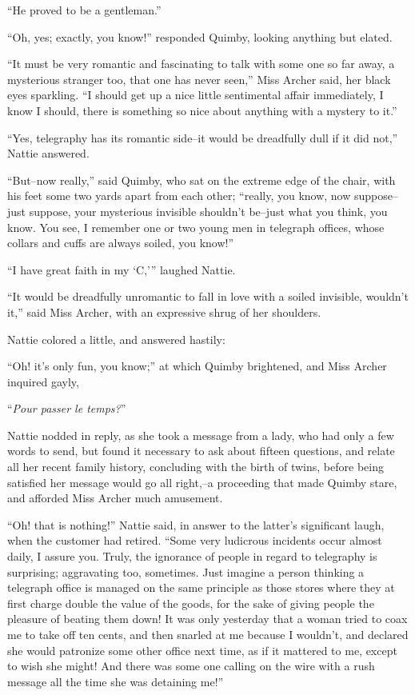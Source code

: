 ``He proved to be a gentleman.''

``Oh, yes; exactly, you know!'' responded Quimby, looking anything but
elated.

``It must be very romantic and fascinating to talk with some one so far
away, a mysterious stranger too, that one has never seen,'' Miss Archer
said, her black eyes sparkling. ``I should get up a nice little
sentimental affair immediately, I know I should, there is something so
nice about anything with a mystery to it.''

``Yes, telegraphy has its romantic side--it would be dreadfully dull if
it did not,'' Nattie answered.

``But--now really,'' said Quimby, who sat on the extreme edge of the
chair, with his feet some two yards apart from each other; ``really, you
know, now suppose--just suppose, your mysterious invisible shouldn't
be--just what you think, you know. You see, I remember one or two young
men in telegraph offices, whose collars and cuffs are always soiled, you
know!''

``I have great faith in my `C,'{}'' laughed Nattie.

``It would be dreadfully unromantic to fall in love with a soiled
invisible, wouldn't it,'' said Miss Archer, with an expressive shrug of
her shoulders.

Nattie colored a little, and answered hastily:

``Oh! it's only fun, you know;'' at which Quimby brightened, and Miss
Archer inquired gayly,

``\emph{Pour passer le temps?}''

Nattie nodded in reply, as she took a message from a lady, who had only
a few words to send, but found it necessary to ask about fifteen
questions, and relate all her recent family history, concluding with the
birth of twins, before being satisfied her message would go all
right,--a proceeding that made Quimby stare, and afforded Miss Archer
much amusement.

``Oh! that is nothing!'' Nattie said, in answer to the latter's
significant laugh, when the customer had retired. ``Some very ludicrous
incidents occur almost daily, I assure you. Truly, the ignorance of
people in regard to telegraphy is surprising; aggravating too,
sometimes. Just imagine a person thinking a telegraph office is managed
on the same principle as those stores where they at first charge double
the value of the goods, for the sake of giving people the pleasure of
beating them down! It was only yesterday that a woman tried to coax me
to take off ten cents, and then snarled at me because I wouldn't, and
declared she would patronize some other office next time, as if it
mattered to me, except to wish she might! And there was some one calling
on the wire with a rush message all the time she was detaining me!''


